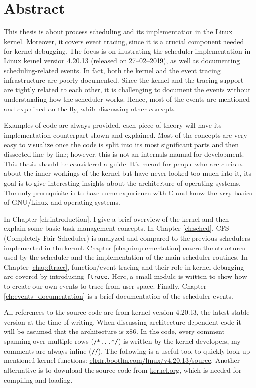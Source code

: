 \chapter{Abstract}
This thesis is about process scheduling and its implementation in the Linux kernel. Moreover, it covers event tracing, since it is a crucial component needed for kernel debugging. 
The focus is on illustrating the scheduler implementation in Linux kernel version 4.20.13 (released on 27--02--2019), as well as documenting scheduling-related events. In fact, both the kernel and the event tracing infrastructure are poorly documented.
Since the kernel and the tracing support are tightly related to each other, it is challenging to document the events without understanding how the scheduler works. Hence, most of the events are mentioned and explained on the fly, while discussing other concepts.

Examples of code are always provided, each piece of theory will have its implementation counterpart shown and explained.
Most of the concepts are very easy to visualize once the code is split into its most significant parts
and then dissected line by line; however, this is not an internals manual for development. 
This thesis should be considered a guide. It's meant for people who are curious about the inner workings of the kernel
but have never looked too much into it, its goal is to give interesting insights about the architecture of operating systems.
The only prerequisite is to have some experience with C and know the very basics of GNU/Linux and operating systems.

In Chapter \ref{ch:introduction}, I give a brief overview of the kernel and then explain some basic task management concepts. 
In Chapter \ref{ch:sched}, CFS (Completely Fair Scheduler) is analyzed and compared to the previous schedulers implemented in the kernel. 
Chapter \ref{chap:implementation} covers the structures used by the scheduler and the implementation of the main scheduler routines.
In Chapter \ref{chap:ftrace}, function/event tracing and their role in kernel debugging are covered by introducing \verb|ftrace|. Here, a small module is written to show how to create our own events to trace from user space.
Finally, Chapter \ref{ch:events_documentation} is a brief documentation of the scheduler events.

All references to the source code are from kernel version 4.20.13, the latest stable version at the time of writing. When discussing architecture dependent code it will be assumed that the architecture is x86. In the code, every comment spanning over multiple rows (\verb|/*...*/|) is written by the kernel developers, my comments are always inline (\verb|//|). The following is a useful tool to quickly look up mentioned kernel functions: \url{elixir.bootlin.com/linux/v4.20.13/source}. Another alternative is to download the source code from \url{kernel.org}, which is needed for compiling and loading. 
